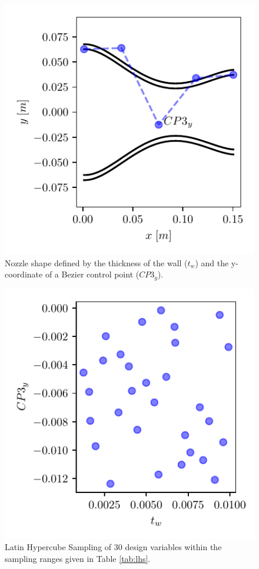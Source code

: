 \documentclass[10pt,oneside,a4paper,twocolumn]{article}
\begin{document}
\begin{figure}[htbp]
\centering
\includegraphics[height=\columnwidth]{figures/nozzle_shape.pdf}
\caption{Nozzle shape defined by the thickness of the wall ($t_w$) and the y-coordinate of a Bezier control point ($CP3_y$).}
\label{fig:nozzle_shape}
\end{figure}

\begin{figure}[htbp]
\centering
\includegraphics[height=\columnwidth]{figures/lhs_sampling.pdf}
\caption{Latin Hypercube Sampling of 30 design variables within the sampling ranges given in Table \ref{tab:lhs}.}
\label{fig:lhs}
\end{figure}
\end{document}
